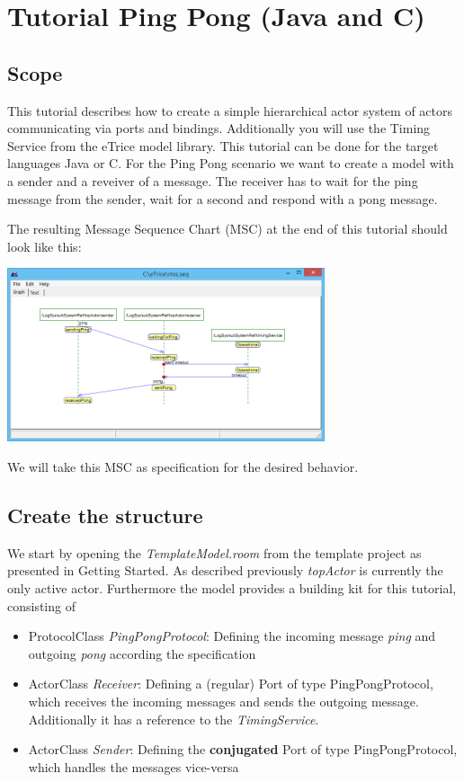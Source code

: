 \section{Tutorial Ping Pong (Java and C)}
\label{sec:ping_pong_tutorial}

\subsection{Scope}

This tutorial describes how to create a simple hierarchical actor system of actors communicating via ports and bindings. 
Additionally you will use the Timing Service from the eTrice model library.
This tutorial can be done for the target languages Java or C.
For the Ping Pong scenario we want to create a model with a sender and a reveiver of a message. The receiver has to wait for the ping message from the sender, wait for a second and respond with a pong message.

The resulting Message Sequence Chart (MSC) at the end of this tutorial should look like this:

\includegraphics[width=0.7\textwidth]{images/015-msc.png}

We will take this MSC as specification for the desired behavior.

\subsection{Create the structure}

We start by opening the \emph{TemplateModel.room} from the template project as presented in Getting Started. As described previously \emph{topActor} is currently the only active actor. Furthermore the model provides a building kit for this tutorial, consisting of
\begin{itemize}
	\item ProtocolClass \emph{PingPongProtocol}: Defining the incoming message \emph{ping} and outgoing \emph{pong} according the specification
	\item ActorClass \emph{Receiver}: Defining a (regular) Port of type PingPongProtocol, which receives the incoming messages and sends the outgoing message. Additionally it has a reference to the \emph{TimingService}.
	\item ActorClass \emph{Sender}: Defining the \textbf{conjugated} Port of type PingPongProtocol, which handles the messages vice-versa
\end{itemize}


